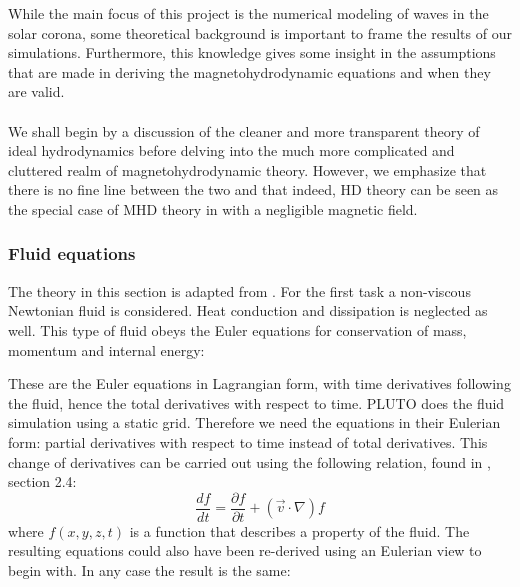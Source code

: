 While the main focus of this project is the numerical modeling of waves in the solar corona, some theoretical background is important to frame the results of our simulations.
Furthermore, this knowledge gives some insight in the assumptions that are made in deriving the magnetohydrodynamic equations and when they are valid. \\
\\
We shall begin by a discussion of the cleaner and more transparent theory of ideal hydrodynamics before delving into the much more complicated and cluttered realm of magnetohydrodynamic theory. However, we emphasize that there is no fine line between the two and that indeed, HD theory can be seen as the special case of MHD theory in with a negligible magnetic field. 

\subsubsection{Fluid equations}
The theory in this section is adapted from \cite{notes-fluid-dynamics}. For the first task a non-viscous Newtonian fluid is considered. Heat conduction and dissipation is neglected as well.
This type of fluid obeys the Euler equations for conservation of mass, momentum and internal energy:

{\centering
\noindent {}\par}


These are the Euler equations in Lagrangian form, with time derivatives following the fluid, hence the total derivatives with respect to time.
PLUTO does the fluid simulation using a static grid. Therefore we need the equations in their Eulerian form: partial derivatives with respect to time instead of total derivatives.
This change of derivatives can be carried out using the following relation, found in \cite{notes-fluid-dynamics}, section 2.4:
\begin{equation}
	\frac{df}{dt} = \frac{\partial f}{\partial t} + (\vec{v} \cdot \nabla) f
	\label{eq:relation-total-partial}
\end{equation}
where $f(x,y,z,t)$ is a function that describes a property of the fluid. The resulting equations could also have been re-derived using an Eulerian view to begin with. In any case the result is the same:

